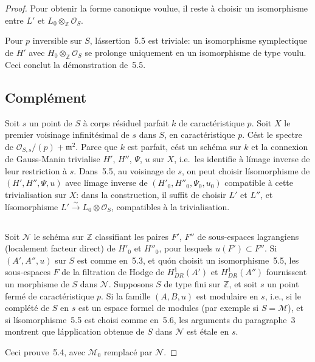 \documentclass[11pt,a4paper]{article}
\theoremstyle{plain}
\theoremstyle{definition}
\begin{document}
\begin{proof}
Pour obtenir la forme canonique voulue, il reste \`a choisir un isomorphisme
entre $L'$ et $L_0 \otimes_\mathbb{Z} \mathscr{O}_S$.

Pour $p$ inversible sur $S$, l\'assertion~5.5 est triviale: un isomorphisme symplectique
de $H'$ avec $H_0 \otimes_\mathbb{Z} \mathscr{O}_S$ se prolonge uniquement en un isomorphisme de type
voulu. Ceci conclut la d\'emonstration de~5.5.

\subsection{Compl\'ement}

Soit $s$ un point de $S$ \`a corps r\'esiduel parfait $k$ de caract\'eristique $p$. Soit $X$ le
premier voisinage infinit\'esimal de $s$ dans $S$, en caract\'eristique $p$. C\'est le spectre
de $\mathscr{O}_{S,s}/(p) + \mathfrak{m}^2$. Parce que $k$ est parfait, c\'est un sch\'ema sur $k$ et la connexion
de Gauss-Manin trivialise $H'$, $H''$, $\Psi$, $u$ sur $X$, i.e.~les identifie \`a l\'image inverse
de leur restriction \`a $s$. Dans~5.5, au voisinage de $s$, on peut choisir
l\'isomorphisme de $(H', H'', \Psi, u)$ avec l\'image inverse de $(H'_0, H''_0, \Psi_0, u_0)$
compatible \`a cette trivialisation sur $X$: dans la construction, il suffit de choisir $L'$
et $L''$, et l\'isomorphisme $L' \xrightarrow{\sim} L_0 \otimes \mathscr{O}_S$, compatibles \`a la trivialisation.

\subsection{}

Soit $\mathscr{N}$ le sch\'ema sur $\mathbb{Z}$ classifiant les paires $F'$, $F''$ de sous-espaces
lagrangiens (localement facteur direct) de $H'_0$ et $H''_0$, pour lesquels $u(F') \subset F''$.
Si $(A', A'', u)$ sur $S$ est comme en~5.3, et qu\'on choisit un isomorphisme~5.5,
les sous-espaces $F$ de la filtration de Hodge de $H^1_{DR}(A')$ et $H^1_{DR}(A'')$ fournissent
un morphisme de $S$ dans $\mathscr{N}$. Supposons $S$ de type fini sur $\mathbb{Z}$, et soit $s$ un point
ferm\'e de caract\'eristique $p$. Si la famille $(A, B, u)$ est modulaire en $s$, i.e., si le
compl\'et\'e de $S$ en $s$ est un espace formel de modules (par exemple si $S = \mathscr{M}$),
et si l\'isomorphisme~5.5 est choisi comme en~5.6, les arguments du paragraphe~3
montrent que l\'application obtenue de $S$ dans $\mathscr{N}$ est \'etale en $s$.

Ceci prouve~5.4, avec $\mathscr{M}_0$ remplac\'e par $\mathscr{N}$.
\end{proof}
\end{document}
